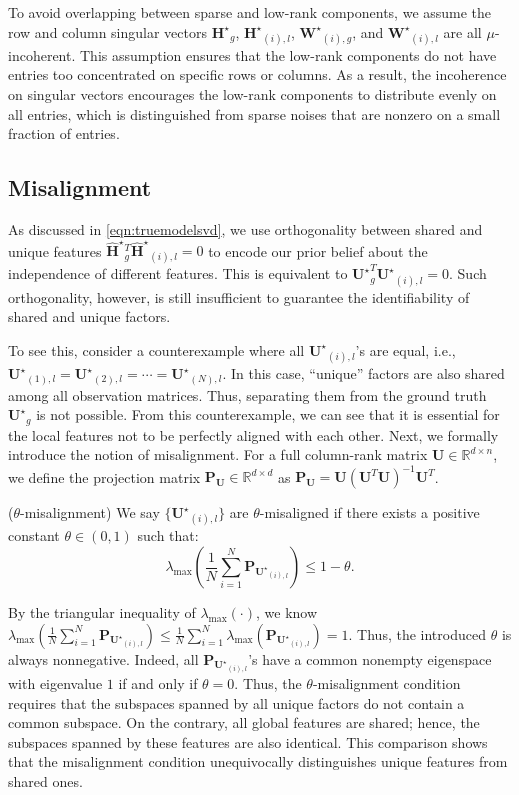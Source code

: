 \documentclass[twoside,11pt]{article}
\newcommand{\Pj}[1]{\mathbf{P}_{#1}}
\newcommand{\hmatHst}{{\hat{\mathbf{H}}}^{\star}{}}
\newcommand{\matHst}{{\mathbf{H}^\star}}
\newcommand{\matP}{\mathbf{P}}
\newcommand{\matU}{\mathbf{U}}
\newcommand{\matUst}{{\mathbf{U}^\star}}
\newcommand{\matWst}{{\mathbf{W}^\star}}
\begin{document}
To avoid overlapping between sparse and low-rank components, we assume the row and column singular vectors $\matHst_g$, $\matHst_{(i),l}$, $\matWst_{(i),g}$, and $\matWst_{(i),l}$ are all $\mu$-incoherent. This assumption ensures that the low-rank components do not have entries too concentrated on specific rows or columns. As a result, the incoherence on singular vectors encourages the low-rank components to distribute evenly on all entries, which is distinguished from sparse noises that are nonzero on a small fraction of entries.


\subsection{Misalignment}
As discussed in \eqref{eqn:truemodelsvd}, we use orthogonality between shared and unique features $\hmatHst_g^T\hmatHst_{(i),l}=0$ to encode our prior belief about the independence of different features. This is equivalent to $\matUst_g^T\matUst_{(i),l}=0$. Such orthogonality, however, is still insufficient to guarantee the identifiability of shared and unique factors. 

To see this, consider a counterexample where all $\matUst_{(i),l}$'s are equal, i.e., $\matUst_{(1),l}=\matUst_{(2),l}=\cdots =\matUst_{(N),l}$. In this case, ``unique'' factors are also shared among all observation matrices. Thus, separating them from the ground truth $\matUst_{g}$ is not possible. From this counterexample, we can see that it is essential for the local features not to be perfectly aligned with each other. Next, we formally introduce the notion of misalignment. For a full column-rank matrix $\matU\in \mathbb{R}^{d\times n}$, we define the projection matrix $\matP_{\matU}\in \mathbb{R}^{d\times d}$ as $\Pj{\matU}=\matU\left(\matU^T\matU\right)^{-1}\matU^T$. 
\begin{definition}
\label{ass:identifiability}
($\theta$-misalignment) We say $\{\matUst_{(i),l}\}$ are $\theta$-misaligned if there exists a positive constant $\theta\in(0,1)$ such that:
\begin{equation}
\lambda_{\max}\left(\frac{1}{N}\sum_{i=1}^N\Pj{\matUst_{(i),l}}\right)\le 1-\theta.
\end{equation}
\end{definition}
By the triangular inequality of $\lambda_{\max}\left(\cdot\right)$, we know $\lambda_{\max}\left(\frac{1}{N}\sum_{i=1}^N\Pj{\matUst_{(i),l}}\right)\le \frac{1}{N}\sum_{i=1}^N\lambda_{\max}\left(\Pj{\matUst_{(i),l}}\right)=1$. Thus, the introduced $\theta$ is always nonnegative. Indeed, all $\Pj{\matUst_{(i),l}}$'s have a common nonempty eigenspace with eigenvalue $1$ if and only if $\theta=0$. Thus, the $\theta$-misalignment condition requires that the subspaces spanned by all unique factors do not contain a common subspace. On the contrary, all global features are shared; hence, the subspaces spanned by these features are also identical. This comparison shows that the misalignment condition unequivocally distinguishes unique features from shared ones.
\end{document}
